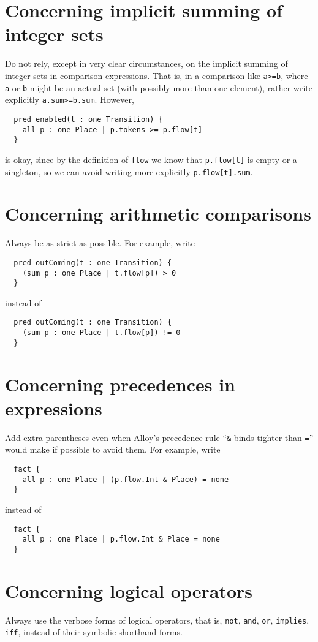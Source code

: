 \documentclass{article}
\begin{document}
\section*{Concerning implicit summing of integer sets}

Do not rely, except in very clear circumstances, on the implicit summing of integer sets in comparison expressions.
That is, in a comparison like \lstinline|a>=b|, where \lstinline|a| or \lstinline|b| might be an actual set (with possibly more than one element), rather write explicitly \lstinline|a.sum>=b.sum|.
However,
\begin{lstlisting}
  pred enabled(t : one Transition) {
    all p : one Place | p.tokens >= p.flow[t]
  }
\end{lstlisting}
is okay, since by the definition of \lstinline|flow| we know that \lstinline|p.flow[t]| is empty or a singleton, so we can avoid writing more explicitly \lstinline|p.flow[t].sum|.

\section*{Concerning arithmetic comparisons}

Always be as strict as possible.
For example, write
\begin{lstlisting}
  pred outComing(t : one Transition) {
    (sum p : one Place | t.flow[p]) > 0
  }
\end{lstlisting}
instead of
\begin{lstlisting}
  pred outComing(t : one Transition) {
    (sum p : one Place | t.flow[p]) != 0
  }
\end{lstlisting}

\section*{Concerning precedences in expressions}

Add extra parentheses even when Alloy's precedence rule ``\lstinline|&| binds tighter than \lstinline|=|'' would make if possible to avoid them.
For example, write
\begin{lstlisting}
  fact {
    all p : one Place | (p.flow.Int & Place) = none
  }
\end{lstlisting}
instead of
\begin{lstlisting}
  fact {
    all p : one Place | p.flow.Int & Place = none
  }
\end{lstlisting}

\section*{Concerning logical operators}

Always use the verbose forms of logical operators, that is, \lstinline|not|, \lstinline|and|, \lstinline|or|, \lstinline|implies|, \lstinline|iff|, instead of their symbolic shorthand forms.
\end{document}
